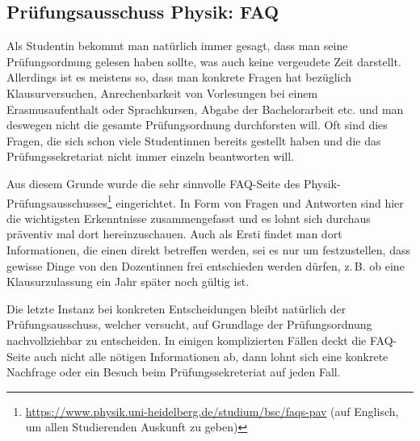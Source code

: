 \vspace{-2mm}
\subsection{Prüfungsausschuss Physik: FAQ}
\vspace{-1mm}
Als Studentin bekommt man natürlich immer gesagt, dass man seine Prüfungsordnung gelesen haben sollte, was auch keine vergeudete Zeit darstellt. Allerdings ist es meistens so, dass man konkrete Fragen hat bezüglich Klausurversuchen, Anrechenbarkeit von Vorlesungen bei einem Erasmusaufenthalt oder Sprachkursen, Abgabe der Bachelorarbeit etc. und man deswegen nicht die gesamte Prüfungsordnung durchforsten will. Oft sind dies Fragen, die sich schon viele Studentinnen bereits gestellt haben und die das Prüfungssekretariat nicht immer einzeln beantworten will. 

Aus diesem Grunde wurde die sehr sinnvolle FAQ-Seite des Physik-Prüfungsausschusses\footnote{\url{https://www.physik.uni-heidelberg.de/studium/bsc/faqs-pav} (auf Englisch, um allen Studierenden Auskunft zu geben)} eingerichtet. In Form von Fragen und Antworten sind hier die wichtigsten Erkenntnisse zusammengefasst und es lohnt sich durchaus präventiv mal dort hereinzuschauen. Auch als Ersti findet man dort Informationen, die einen direkt betreffen werden, sei es nur um festzustellen, dass gewisse Dinge von den Dozentinnen frei entschieden werden dürfen, z.\,B. ob eine Klausurzulassung ein Jahr später noch gültig ist.

Die letzte Instanz bei konkreten Entscheidungen bleibt natürlich der Prüfungsausschuss, welcher versucht, auf Grundlage der Prüfungsordnung nachvollziehbar zu entscheiden. In einigen komplizierten Fällen deckt die FAQ-Seite auch nicht alle nötigen Informationen ab, dann lohnt sich eine konkrete Nachfrage oder ein Besuch beim Prüfungssekreteriat auf jeden Fall.
